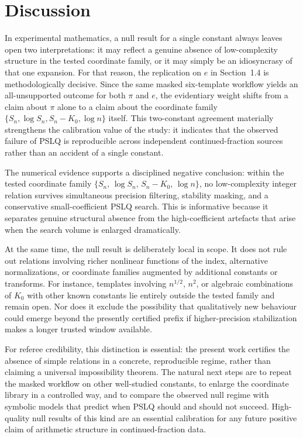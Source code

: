 \documentclass[11pt]{article}
\begin{document}


\section{Discussion}

In experimental mathematics, a null result for a single constant always leaves open two interpretations: it may reflect a genuine absence of low-complexity structure in the tested coordinate family, or it may simply be an idiosyncrasy of that one expansion. For that reason, the replication on $e$ in Section~1.4 is methodologically decisive. Since the same masked six-template workflow yields an all-unsupported outcome for both $\pi$ and $e$, the evidentiary weight shifts from a claim about $\pi$ alone to a claim about the coordinate family $\{S_n,\log S_n,S_n-K_0,\log n\}$ itself. This two-constant agreement materially strengthens the calibration value of the study: it indicates that the observed failure of PSLQ is reproducible across independent continued-fraction sources rather than an accident of a single constant.

The numerical evidence supports a disciplined negative conclusion: within the tested coordinate family $\{S_n,\, \log S_n,\, S_n-K_0,\, \log n\}$, no low-complexity integer relation survives simultaneous precision filtering, stability masking, and a conservative small-coefficient PSLQ search. This is informative because it separates genuine structural absence from the high-coefficient artefacts that arise when the search volume is enlarged dramatically.

At the same time, the null result is deliberately local in scope. It does not rule out relations involving richer nonlinear functions of the index, alternative normalizations, or coordinate families augmented by additional constants or transforms. For instance, templates involving $n^{1/2}$, $n^2$, or algebraic combinations of $K_0$ with other known constants lie entirely outside the tested family and remain open. Nor does it exclude the possibility that qualitatively new behaviour could emerge beyond the presently certified prefix if higher-precision stabilization makes a longer trusted window available.

For referee credibility, this distinction is essential: the present work certifies the absence of simple relations in a concrete, reproducible regime, rather than claiming a universal impossibility theorem. The natural next steps are to repeat the masked workflow on other well-studied constants, to enlarge the coordinate library in a controlled way, and to compare the observed null regime with symbolic models that predict when PSLQ should and should not succeed. High-quality null results of this kind are an essential calibration for any future positive claim of arithmetic structure in continued-fraction data.
\end{document}
